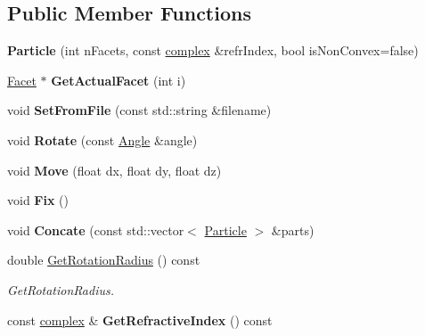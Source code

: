 \subsection*{Public Member Functions}
\begin{DoxyCompactItemize}
\item 
\mbox{\label{class_particle_ade07dfa403a16f3a9faad7fec89d658a}} 
{\bfseries Particle} (int n\+Facets, const \mbox{\hyperlink{classcomplex}{complex}} \&refr\+Index, bool is\+Non\+Convex=false)
\item 
\mbox{\label{class_particle_a3ea99e51c15fc69406a9d4812eff7248}} 
\mbox{\hyperlink{class_facet}{Facet}} $\ast$ {\bfseries Get\+Actual\+Facet} (int i)
\item 
\mbox{\label{class_particle_a6877eea54e7fb816809dd2be6cd5acdc}} 
void {\bfseries Set\+From\+File} (const std\+::string \&filename)
\item 
\mbox{\label{class_particle_a55618b93d3d41f7d16af88f28dc4281b}} 
void {\bfseries Rotate} (const \mbox{\hyperlink{class_angle}{Angle}} \&angle)
\item 
\mbox{\label{class_particle_a62328fcaf288317fa6667ee9bba90de4}} 
void {\bfseries Move} (float dx, float dy, float dz)
\item 
\mbox{\label{class_particle_a3e8f5b164ae0571114a98c2bafd15892}} 
void {\bfseries Fix} ()
\item 
\mbox{\label{class_particle_aecdc7104b12fab4e8485ef56546b4e1b}} 
void {\bfseries Concate} (const std\+::vector$<$ \mbox{\hyperlink{class_particle}{Particle}} $>$ \&parts)
\item 
double \mbox{\hyperlink{class_particle_ab06b62449ba3213e3f8bf580a910dd66}{Get\+Rotation\+Radius}} () const
\begin{DoxyCompactList}\small\item\em Get\+Rotation\+Radius. \end{DoxyCompactList}\item 
\mbox{\label{class_particle_a5883ada02784b29b5cb1851f16f48066}} 
const \mbox{\hyperlink{classcomplex}{complex}} \& {\bfseries Get\+Refractive\+Index} () const

\end{DoxyCompactItemize}

